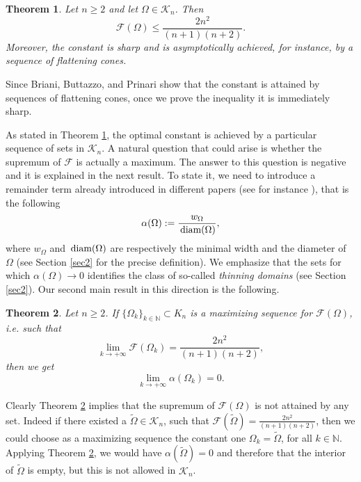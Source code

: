 \documentclass[oneside,a4paper,11pt,notitlepage]{article}
\theoremstyle{definition}
\theoremstyle{plain}
\newtheorem{teorema}{Theorem}[section]
\theoremstyle{definition}
\DeclareMathOperator{\diam}{\, \textup{diam}}
\begin{document}
\begin{teorema}\label{thm:main}
Let $n \geq 2$ and let $\Omega\in \mathcal{K}_n$. Then
\begin{equation*}
\mathcal F(\Omega) \leq \frac{2n^2}{(n+1)(n+2)}.
\end{equation*}
Moreover, the constant is sharp and is asymptotically achieved, for instance, by a sequence of flattening cones.
\end{teorema}

Since Briani, Buttazzo, and Prinari \cite{buttazzo2020convex} show that the constant is attained by sequences of flattening cones, once we prove the inequality it is immediately sharp.

As stated in Theorem \ref{thm:main}, the optimal constant is achieved by a particular sequence of sets in $\mathcal{K}_n$. A natural question that could arise is whether the supremum of $\mathcal{F}$ is actually a maximum. The answer to this question is negative and it is explained in the next result. To state it, we need to introduce a remainder term already introduced in different papers (see for instance \cite{ABF,ABF2, AGS,AMPS}), that is the following
\begin{equation}\label{alpha}
 \alpha(\Omega) := \frac{w_\Omega}{\diam(\Omega)},
\end{equation}
where $w_\Omega$ and $\diam(\Omega)$ are respectively the minimal width and the diameter of $\Omega$ (see Section \ref{sec2} for the precise definition). We emphasize that the sets for which $\alpha(\Omega)\to 0$ identifies the class of so-called \textit{thinning domains} (see Section \ref{sec2}). Our second main result in this direction is the following.
\begin{teorema}\label{thm:supremum}
 Let $n\ge 2$. If $\{\Omega_k\}_{k\in \mathbb N}\subset K_n$  is a maximizing sequence for $\mathcal{F}(\Omega)$, i.e. such that 
    \begin{equation*}\label{eq:SharpMakai}
        \lim_{k\to +\infty}\mathcal{F}(\Omega_k)= \frac{2n^2}{(n+1)(n+2)},
    \end{equation*}
then we get
    $$\lim_{k\to+\infty} \alpha(\Omega_k)=0.$$
    \end{teorema}
Clearly Theorem \ref{thm:supremum} implies that the supremum of $\mathcal{F}(\Omega)$ is not attained by any set. Indeed if there existed a $\tilde{\Omega}\in \mathcal{K}_n$, such that $\mathcal{F}(\tilde{\Omega})= \frac{2n^2}{(n+1)(n+2)}$, then we could choose as a maximizing sequence the constant one $\Omega_k = \tilde\Omega$, for all $k\in \mathbb N$. Applying Theorem \ref{thm:supremum}, we would have $\alpha(\tilde\Omega)=0$ and therefore that the interior of $\tilde\Omega$ is empty, but this is not allowed in $\mathcal{K}_n$.\\
\end{document}
